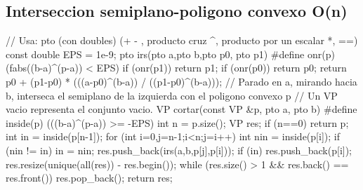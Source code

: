 \documentclass[10pt,landscape,twocolumn,a4paper,notitlepage]{article}
\begin{document}
\subsection{Interseccion semiplano-poligono convexo O(n)}
\begin{code}
// Usa: pto (con doubles) (+ - , producto cruz ^, producto por un escalar *, ==)
const double EPS = 1e-9;
pto irs(pto a,pto b,pto p0, pto p1) {
    #define onr(p) (fabs((b-a)^(p-a)) < EPS)
    if (onr(p1)) return p1;
    if (onr(p0)) return p0;
    return p0 + (p1-p0) * (((a-p0)^(b-a)) / ((p1-p0)^(b-a)));
}
// Parado en a, mirando hacia b, interseca el semiplano de la izquierda con el poligono convexo p
// Un VP vacio representa el conjunto vacio.
VP cortar(const VP &p, pto a, pto b) {
    #define inside(p) (((b-a)^(p-a)) >= -EPS)
    int n = p.size();
    VP res; if (n==0) return p;
    int in = inside(p[n-1]);
    for (int i=0,j=n-1;i<n;j=i++) {
        int nin = inside(p[i]);
        if (nin != in) {
            in = nin;
            res.push_back(irs(a,b,p[j],p[i]));
        }
        if (in) res.push_back(p[i]);
    }
    res.resize(unique(all(res)) - res.begin());
    while (res.size() > 1 && res.back() == res.front()) res.pop_back();
    return res;
}
\end{code}
\end{document}
